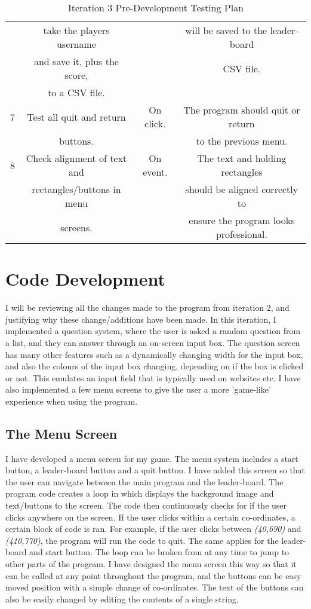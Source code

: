 \documentclass[12pt]{report}
\begin{document}
\begin{table}[H]
\begin{tabular}{|c|c|c|c|}
    & take the players username  & & will be saved to the leader-board\\
    & and save it, plus the score, & & CSV file.\\
    & to a CSV file. & & \\
    \hline
    7 & Test all quit and return & On click. & The program should quit or return\\
    & buttons. & & to the previous menu.\\
    \hline
    8 & Check alignment of text and & On event. & The text and holding rectangles \\
      & rectangles/buttons in menu & & should be aligned correctly to \\
      & screens. & & ensure the program looks professional.  \\
    \hline
    \end{tabular}
    \caption{Iteration 3 Pre-Development Testing Plan}
    \label{TestTable}
\end{table}

\pagebreak

\section{Code Development}
I will be reviewing all the changes made to the program from iteration 2, and justifying why these change/additions have been made. In this iteration, I implemented a question system, where the user is asked a random question from a list, and they can answer through an on-screen input box. The question screen has many other features such as a dynamically changing width for the input box, and also the colours of the input box changing, depending on if the box is clicked or not. This emulates an input field that is typically used on websites etc. I have also implemented a few menu screens to give the user a more 'game-like' experience when using the program.

\subsection{The Menu Screen}
I have developed a menu screen for my game. The menu system includes a start button, a leader-board button and a quit button. I have added this screen so that the user can navigate between the main program and the leader-board. The program code creates a loop in which displays the background image and text/buttons to the screen. The code then continuously checks for if the user clicks anywhere on the screen. If the user clicks within a certain co-ordinates, a certain block of code is ran. For example, if the user clicks between \textit{(40,690)} and \textit{(410,770)}, the program will run the code to quit. The same applies for the leader-board and start button. The loop can be broken from at any time to jump to other parts of the program. I have designed the menu screen this way so that it can be called at any point throughout the program, and the buttons can be easy moved position with a simple change of co-ordinates. The text of the buttons can also be easily changed by editing the contents of a single string.
\end{document}
